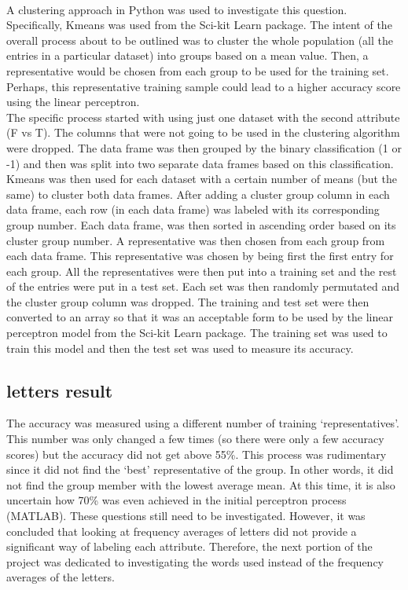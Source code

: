 \documentclass{article}
\begin{document}
\\
A clustering approach in Python was used to investigate this question. Specifically, Kmeans was used from the Sci-kit Learn package. The intent of the overall process about to be outlined was to cluster the whole population (all the entries in a particular dataset) into groups based on a mean value. Then, a representative would be chosen from each group to be used for the training set. Perhaps, this representative training sample could lead to a higher accuracy score using the linear perceptron.
\\
The specific process started with using just one dataset with the second attribute (F vs T). The columns that were not going to be used in the clustering algorithm were dropped. The data frame was then grouped by the binary classification (1 or -1) and then was split into two separate data frames based on this classification. 
\\
Kmeans was then used for each dataset with a certain number of means (but the same) to cluster both data frames. After adding a cluster group column in each data frame, each row (in each data frame) was labeled with its corresponding group number. Each data frame, was then sorted in ascending order based on its cluster group number. A representative was then chosen from each group from each data frame. This representative was chosen by being first the first entry for each group. All the representatives were then put into a training set and the rest of the entries were put in a test set. Each set was then randomly permutated and the cluster group column was dropped. The training and test set were then converted to an array so that it was an acceptable form to be used by the linear perceptron model from the Sci-kit Learn package. The training set was used to train this model and then the test set was used to measure its accuracy.

\subsection{letters result}
The accuracy was measured using a different number of training ‘representatives’. This number was only changed a few times (so there were only a few accuracy scores) but the accuracy did not get above 55\%. This process was rudimentary since it did not find the ‘best’ representative of the group. In other words, it did not find the group member with the lowest average mean. At this time, it is also uncertain how 70\% was even achieved in the initial perceptron process (MATLAB). These questions still need to be investigated. However, it was concluded that looking at frequency averages of letters did not provide a significant way of labeling each attribute. Therefore, the next portion of the project was dedicated to investigating the words used instead of the frequency averages of the letters.
\end{document}
